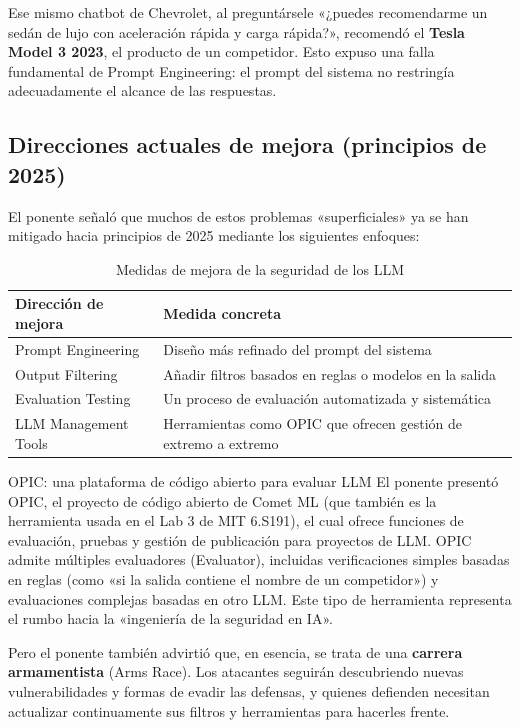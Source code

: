 Ese mismo chatbot de Chevrolet, al preguntársele «¿puedes recomendarme un sedán de lujo con aceleración rápida y carga rápida?», recomendó el \textbf{Tesla Model 3 2023}, el producto de un competidor. Esto expuso una falla fundamental de Prompt Engineering: el prompt del sistema no restringía adecuadamente el alcance de las respuestas.

\subsection{Direcciones actuales de mejora (principios de 2025)}

El ponente señaló que muchos de estos problemas «superficiales» ya se han mitigado hacia principios de 2025 mediante los siguientes enfoques:

\begin{table}[H]
\centering
\caption{Medidas de mejora de la seguridad de los LLM}
\begin{tabular}{@{}ll@{}}
\toprule
\textbf{Dirección de mejora} & \textbf{Medida concreta} \\
\midrule
Prompt Engineering & Diseño más refinado del prompt del sistema \\
Output Filtering & Añadir filtros basados en reglas o modelos en la salida \\
Evaluation Testing & Un proceso de evaluación automatizada y sistemática \\
LLM Management Tools & Herramientas como OPIC que ofrecen gestión de extremo a extremo \\
\bottomrule
\end{tabular}
\end{table}

\begin{knowledgebox}{OPIC: una plataforma de código abierto para evaluar LLM}
El ponente presentó OPIC, el proyecto de código abierto de Comet ML (que también es la herramienta usada en el Lab 3 de MIT 6.S191), el cual ofrece funciones de evaluación, pruebas y gestión de publicación para proyectos de LLM. OPIC admite múltiples evaluadores (Evaluator), incluidas verificaciones simples basadas en reglas (como «si la salida contiene el nombre de un competidor») y evaluaciones complejas basadas en otro LLM. Este tipo de herramienta representa el rumbo hacia la «ingeniería de la seguridad en IA».
\end{knowledgebox}

Pero el ponente también advirtió que, en esencia, se trata de una \textbf{carrera armamentista} (Arms Race). Los atacantes seguirán descubriendo nuevas vulnerabilidades y formas de evadir las defensas, y quienes defienden necesitan actualizar continuamente sus filtros y herramientas para hacerles frente.

